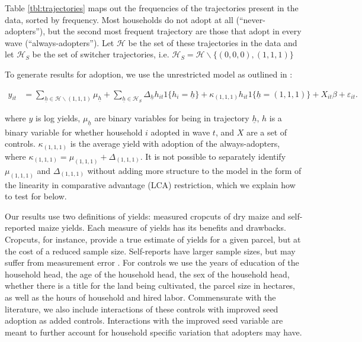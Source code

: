 \documentclass[11pt]{article}
\begin{document}
Table \ref{tbl:trajectories} maps out the frequencies of the trajectories present in the data, sorted by frequency. Most households do not adopt at all (``never-adopters''), but the second most frequent trajectory are those that adopt in every wave (``always-adopters''). Let $\mathcal{H}$ be the set of these trajectories in the data and let $\mathcal{H}_S$ be the set of switcher trajectories, i.e. $\mathcal{H}_S = \mathcal{H}\backslash\{(0,0,0), (1,1,1)\}$

To generate results for adoption, we use the unrestricted model as outlined in \cite{Tjernstrom_Emilia_Dalia_Ghanem_Oscar_Barriga_Cabanillas_Travis_J_Lybbert_Jeffrey_D_Michler_and_Aleksandr_Michuda2020-bc}:

\begin{align}
y_{it}&=\sum_{\underline{h}\in\mathcal{H}\backslash (1,1,1)}\mu_{\underline{h}}+\sum_{\underline{h}\in\mathcal{H}_{S}}\Delta_{\underline{h}}h_{it}1\{h_{i}=\underline{h}\} + \kappa_{(1,1,1)}h_{it}1\{\underline{h}=(1,1,1)\}+ X_{it}\beta+\varepsilon_{it}.\label{eq:GRC}
\end{align}

where $y$ is log yields, $\mu_{\underline{h}}$ are binary variables for being in trajectory $\underline{h}$, $h$ is a binary variable for whether household $i$ adopted in wave $t$, and $X$ are a set of controls. $\kappa_{(1,1,1)}$ is the average yield with adoption of the always-adopters, where $\kappa_{(1,1,1)} = \mu_{(1,1,1)} + \Delta_{(1,1,1)}$. It is not possible to separately identify $\mu_{(1,1,1)}$ and $\Delta_{(1,1,1)}$ without adding more structure to the model in the form of the linearity in comparative advantage (LCA) restriction, which we explain how to test for below.

Our results use two definitions of yields: measured cropcuts of dry maize and self-reported maize yields. Each measure of yields has its benefits and drawbacks. Cropcuts, for instance, provide a true estimate of yields for a given parcel, but at the cost of a reduced sample size. Self-reports have larger sample sizes, but may suffer from measurement error \citep{gollin2021heterogeneity}. For controls we use the years of education of the household head, the age of the household head, the sex of the household head, whether there is a title for the land being cultivated, the parcel size in hectares, as well as the hours of household and hired labor. Commensurate with the literature, we also include interactions of these controls with improved seed adoption as added controls. Interactions with the improved seed variable are meant to further account for household specific variation that adopters may have. 
\end{document}
